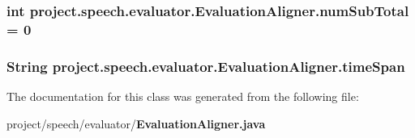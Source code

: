 \subsubsection[{num\+Sub\+Total}]{\setlength{\rightskip}{0pt plus 5cm}int project.\+speech.\+evaluator.\+Evaluation\+Aligner.\+num\+Sub\+Total = 0\hspace{0.3cm}{\ttfamily [private]}}\label{classproject_1_1speech_1_1evaluator_1_1_evaluation_aligner_a8e7f217f3f0f53b126d44d40484f427a}
\subsubsection[{time\+Span}]{\setlength{\rightskip}{0pt plus 5cm}String project.\+speech.\+evaluator.\+Evaluation\+Aligner.\+time\+Span\hspace{0.3cm}{\ttfamily [private]}}\label{classproject_1_1speech_1_1evaluator_1_1_evaluation_aligner_a599b179bad8addf825b8c50734fddf77}


The documentation for this class was generated from the following file\+:\begin{DoxyCompactItemize}
\item 
project/speech/evaluator/{\bf Evaluation\+Aligner.\+java}\end{DoxyCompactItemize}
